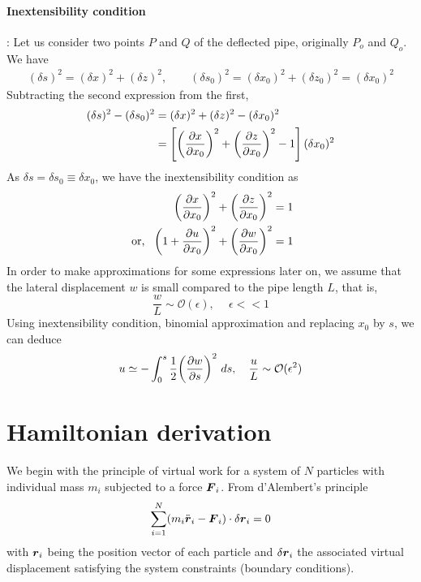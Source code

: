 \documentclass[12pt]{report}
\begin{document}
\paragraph{Inextensibility condition}:
Let us consider two points $P$ and $Q$ of the deflected pipe, originally $P_o$ and $Q_o$. We have
\begin{align*}
 (\delta s)^2 = (\delta x)^2 + (\delta z)^2, \qquad (\delta s_0)^2 = (\delta x_0)^2 + (\delta z_0)^2 = (\delta x_0)^2
\end{align*}
Subtracting the second expression from the first,
\begin{align*}
(\delta s)^2 -  (\delta s_0)^2 &= (\delta x)^2 + (\delta z)^2 - (\delta x_0)^2 \\
                     &= \left[\left(\pdv{x}{x_0}\right)^2 + \left(\pdv{z}{x_0}\right)^2 - 1\right](\delta x_0)^2 
\end{align*} 
As $\delta s = \delta s_0 \equiv \delta x_0$, we have the inextensibility condition as
\begin{align}
   \left(\pdv{x}{x_0}\right)^2 + \left(\pdv{z}{x_0}\right)^2 &= 1 \notag \\
 \text{ or, } ~ \left(1 + \pdv{u}{x_0}\right)^2 + \left(\pdv{w}{x_0}\right)^2 &= 1  \label{eqn:inextensibility}
\end{align}
In order to make approximations for some expressions later on, we assume that the lateral displacement $w$ is small compared to the pipe length $L$, that is,
$$\frac{w}{L} \sim \mathcal{O} (\epsilon), ~\quad \epsilon << 1$$
Using inextensibility condition, binomial approximation and replacing $x_0$ by $s$, we can deduce 
\begin{align*}
   u \simeq - \int_0^s \frac{1}{2} \bigg(\pdv{w}{s}\bigg)^2~ds, \quad \frac{u}{L} \sim \mathcal{O} (\epsilon^2)
\end{align*}

\section{Hamiltonian derivation}
We begin with the principle of virtual work for a system of $N$ particles with individual mass $m_i$ subjected to a force $\vb*{F}_i$. From d'Alembert's principle
\begin{align}
   \sum_{i=1}^N (m_i\ddot{\vb*{r}}_i - \vb*{F}_i)\cdot \delta \vb*{r}_i = 0 \label{eqn:dAlembert}
\end{align}
with $\vb*{r}_i$ being the position vector of each particle and $\delta \vb*{r}_i$ the associated virtual displacement satisfying the system constraints (boundary conditions).
\end{document}
